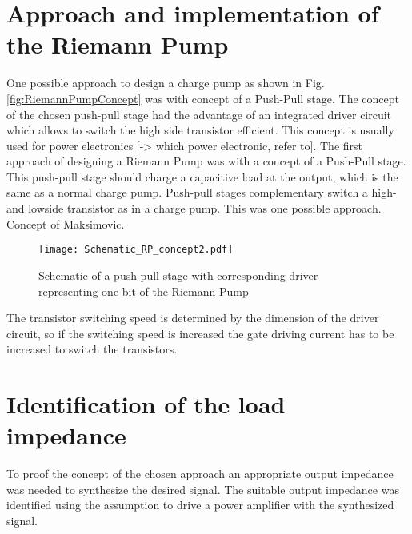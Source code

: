 \section{Approach and implementation of the Riemann Pump}
One possible approach to design a charge pump as shown in Fig. \ref{fig:RiemannPumpConcept} was with concept of a Push-Pull stage.
The concept of the chosen push-pull stage had the advantage of an integrated driver circuit which allows to switch the high side transistor efficient.
This concept is usually used for power electronics [-> which power electronic, refer to].
The first approach of designing a Riemann Pump was with a concept of a Push-Pull stage. This push-pull stage should charge a capacitive load at the output, which is the same as a normal charge pump. Push-pull stages complementary switch a high- and lowside transistor as in a charge pump. This was one possible approach. Concept of Maksimovic.




\begin{figure}[ht]
	\centering
  \texttt{[image: Schematic\_RP\_concept2.pdf]}
	\caption{Schematic of a push-pull stage with corresponding driver representing one bit of the Riemann Pump}
	\label{RiemannPump}
\end{figure}

%
%   
 
 The transistor switching speed is determined by the dimension of the driver circuit, so if the switching speed is increased the gate driving current has to be increased to switch the transistors.
 
 


\section{Identification of the load impedance}
To proof the concept of the chosen approach an appropriate output impedance was needed to synthesize the desired signal.
The suitable output impedance was identified using the assumption to drive a power amplifier with the synthesized signal.


